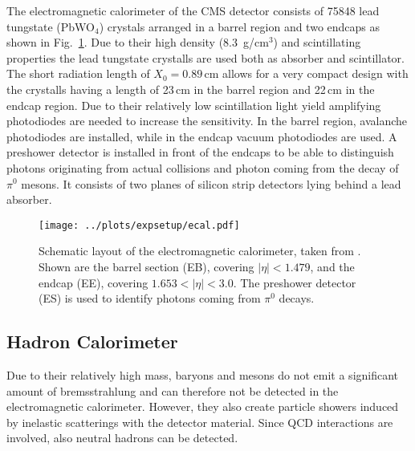 \noindent The electromagnetic calorimeter of the CMS detector consists of 75848 lead tungstate (PbWO$_4$) crystals arranged in a barrel region and two endcaps as shown in Fig.~\ref{fig:expsetup:ecal}. Due to their high density (8.3\, g/cm$^3$) and scintillating properties the lead tungstate crystalls are used both as absorber and scintillator. The short radiation length of $X_0=0.89$\,cm allows for a very compact design with the crystalls having a length of 23\,cm in the barrel region and 22\,cm in the endcap region. Due to their relatively low scintillation light yield amplifying photodiodes are needed to increase the sensitivity. In the barrel region, avalanche photodiodes are installed, while in the endcap vacuum photodiodes are used. A preshower detector is installed in front of the endcaps to be able to distinguish photons originating from actual collisions and photon coming from the decay of $\pi^0$ mesons. It consists of two planes of silicon strip detectors lying behind a lead absorber.
\begin{figure}
    \centering
    \texttt{[image: ../plots/expsetup/ecal.pdf]}
    \caption[Schematic layout of the electromagnetic calorimeter]{Schematic layout of the electromagnetic calorimeter, taken from \cite{CMS_design}. Shown are the barrel section (EB), covering $|\eta|<1.479$, and the endcap (EE), covering $1.653<|\eta|<3.0$. The preshower detector (ES) is used to identify photons coming from $\pi^0$ decays.}
    \label{fig:expsetup:ecal}
\end{figure}
\subsection*{Hadron Calorimeter}
Due to their relatively high mass, baryons and mesons do not emit a significant amount of bremsstrahlung and can therefore not be detected in the electromagnetic calorimeter. However, they also create particle showers induced by inelastic scatterings with the detector material. Since QCD interactions are involved, also neutral hadrons can be detected.\\

